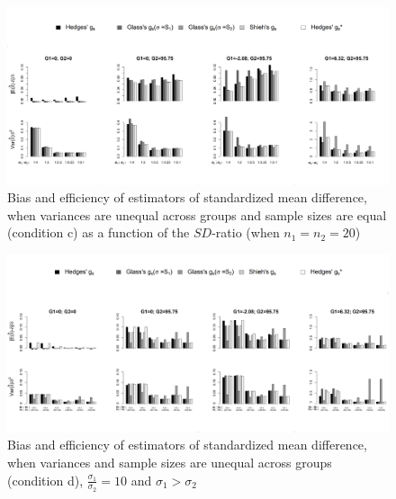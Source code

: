 \documentclass[
  english,
  man,floatsintext]{apa6}
\begin{document}
\begin{figure}

{\centering \includegraphics[width=6.31in]{Scripts outputs/Quality of ES measures/Graphs/Unbiased estimators/Combined Figures_relative quality/Het_bal_sd} 

}

\caption{Bias and efficiency of estimators of standardized mean difference, when variances are unequal across groups and sample sizes are equal (condition c) as a function of the $SD$-ratio (when $n_1=n_2=20$)}\label{fig:idHetbal2}
\end{figure}

\begin{figure}

{\centering \includegraphics[width=6.29in]{Scripts outputs/Quality of ES measures/Graphs/Unbiased estimators/Combined Figures_relative quality/Het_firstlarger_SDR10} 

}

\caption{Bias and efficiency of estimators of standardized mean difference, when variances and sample sizes are unequal across groups (condition d), $\frac{\sigma_1}{\sigma_2}=10$ and $\sigma_1>\sigma_2$}\label{fig:idHetunbal1}
\end{figure}
\end{document}
